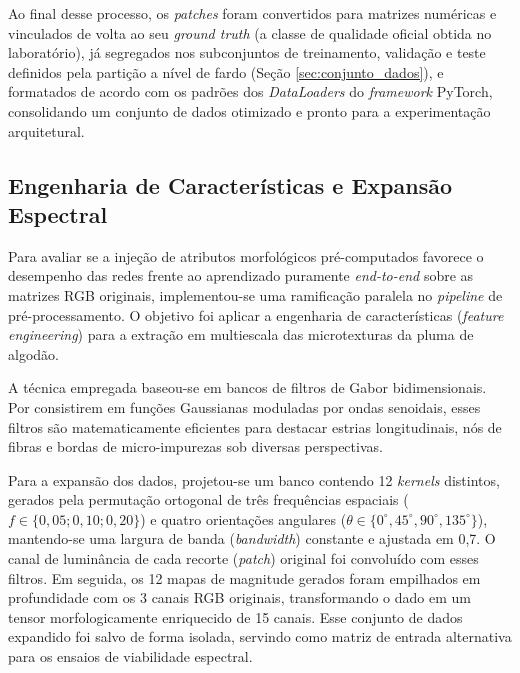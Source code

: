     Ao final desse processo, os \textit{patches} foram convertidos para matrizes numéricas e vinculados de volta ao seu \textit{ground truth} (a classe de qualidade oficial obtida no laboratório), já segregados nos subconjuntos de treinamento, validação e teste definidos pela partição a nível de fardo (Seção \ref{sec:conjunto_dados}), e formatados de acordo com os padrões dos \textit{DataLoaders} do \textit{framework} PyTorch, consolidando um conjunto de dados otimizado e pronto para a experimentação arquitetural.



\subsection{Engenharia de Características e Expansão Espectral}

    Para avaliar se a injeção de atributos morfológicos pré-computados favorece o desempenho das redes frente ao aprendizado puramente \textit{end-to-end} sobre as matrizes RGB originais, implementou-se uma ramificação paralela no \textit{pipeline} de pré-processamento. O objetivo foi aplicar a engenharia de características (\textit{feature engineering}) para a extração em multiescala das microtexturas da pluma de algodão.

    A técnica empregada baseou-se em bancos de filtros de Gabor bidimensionais. Por consistirem em funções Gaussianas moduladas por ondas senoidais, esses filtros são matematicamente eficientes para destacar estrias longitudinais, nós de fibras e bordas de micro-impurezas sob diversas perspectivas.

    Para a expansão dos dados, projetou-se um banco contendo 12 \textit{kernels} distintos, gerados pela permutação ortogonal de três frequências espaciais ($f \in \{0,05; 0,10; 0,20\}$) e quatro orientações angulares ($\theta \in \{0^\circ, 45^\circ, 90^\circ, 135^\circ\}$), mantendo-se uma largura de banda (\textit{bandwidth}) constante e ajustada em 0,7. O canal de luminância de cada recorte (\textit{patch}) original foi convoluído com esses filtros. Em seguida, os 12 mapas de magnitude gerados foram empilhados em profundidade com os 3 canais RGB originais, transformando o dado em um tensor morfologicamente enriquecido de 15 canais. Esse conjunto de dados expandido foi salvo de forma isolada, servindo como matriz de entrada alternativa para os ensaios de viabilidade espectral.